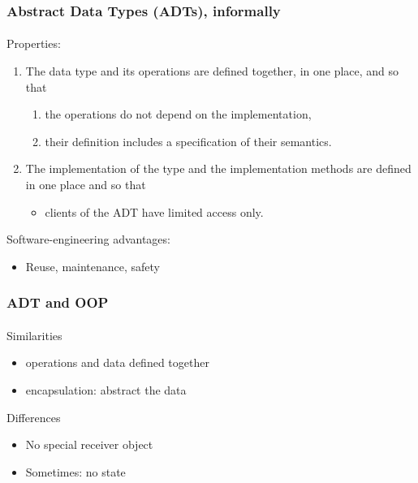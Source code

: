 \documentclass{beamer}
\begin{document}
\begin{frame}[fragile]
\frametitle{Abstract Data Types (ADTs), informally}
\framesubtitle{}
Properties: 

\begin{enumerate}
\item The data type and its operations are defined 
together, in one place, and so that
\begin{enumerate}
\item the operations do not depend on the implementation,
\item their definition includes a specification of their semantics.
\end{enumerate}
\item The implementation of the type and the implementation methods
are defined in one place and so that 
\begin{itemize}
\item clients of the ADT have
limited access only. 
\end{itemize}
\end{enumerate}
\bigskip

Software-engineering advantages:
\begin{itemize}
\item Reuse, maintenance, safety %
\end{itemize}
\end{frame}

\begin{frame}
\frametitle{ADT and OOP}
\framesubtitle{}

Similarities
\begin{itemize}
  \item operations and data defined together
  \item encapsulation: abstract the data
\end{itemize}

Differences
\begin{itemize}
  \item No special receiver object
  \item Sometimes: no state
\end{itemize}


\end{frame}
\end{document}
